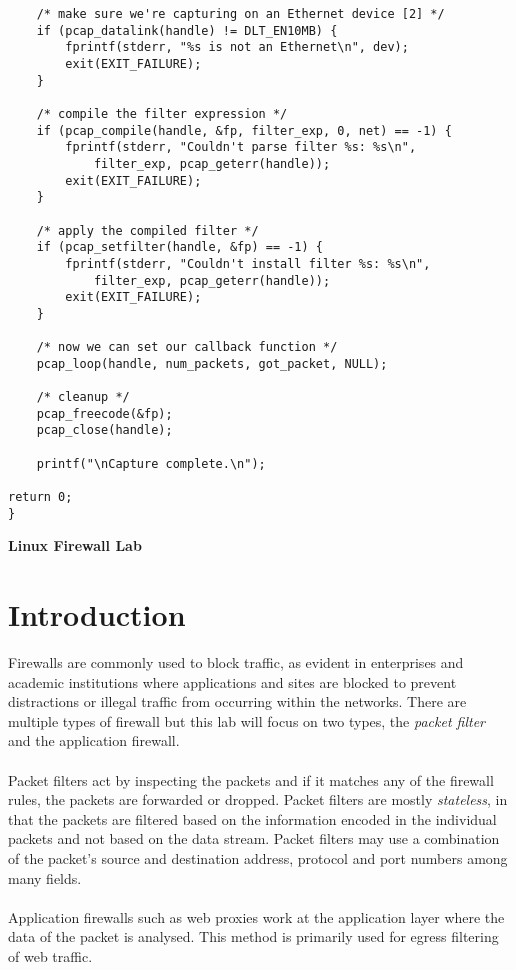 \documentclass[a4paper,12pt]{article}
\begin{document}
\begin{verbatim}
	/* make sure we're capturing on an Ethernet device [2] */
	if (pcap_datalink(handle) != DLT_EN10MB) {
		fprintf(stderr, "%s is not an Ethernet\n", dev);
		exit(EXIT_FAILURE);
	}

	/* compile the filter expression */
	if (pcap_compile(handle, &fp, filter_exp, 0, net) == -1) {
		fprintf(stderr, "Couldn't parse filter %s: %s\n",
		    filter_exp, pcap_geterr(handle));
		exit(EXIT_FAILURE);
	}

	/* apply the compiled filter */
	if (pcap_setfilter(handle, &fp) == -1) {
		fprintf(stderr, "Couldn't install filter %s: %s\n",
		    filter_exp, pcap_geterr(handle));
		exit(EXIT_FAILURE);
	}

	/* now we can set our callback function */
	pcap_loop(handle, num_packets, got_packet, NULL);

	/* cleanup */
	pcap_freecode(&fp);
	pcap_close(handle);

	printf("\nCapture complete.\n");

return 0;
}
			\end{verbatim}
			\restoregeometry
\begin{titlepage}
		\begin{center}
		\vspace*{27em}
		\Huge
			\textbf{Linux Firewall Lab}
			\vfill
		\end{center}
	\end{titlepage}
	
	\newpage
	\setcounter{section}{0}
	\section{Introduction}
	Firewalls are commonly used to block traffic, as evident in enterprises and academic institutions where applications and sites are blocked to prevent distractions or illegal traffic from occurring within the networks. There are multiple types of firewall but this lab will focus on two types, the \textit{packet filter} and the application firewall.\\\\Packet filters act by inspecting the packets and if it matches any of the firewall rules, the packets are forwarded or dropped. Packet filters are mostly \textit{stateless}, in that the packets are filtered based on the information encoded in the individual packets and not based on the data stream. Packet filters may use a combination of the packet's source and destination address, protocol and port numbers among many fields.\\\\Application firewalls such as web proxies work at the application layer where the data of the packet is analysed. This method is primarily used for egress filtering of web traffic.
\end{document}
